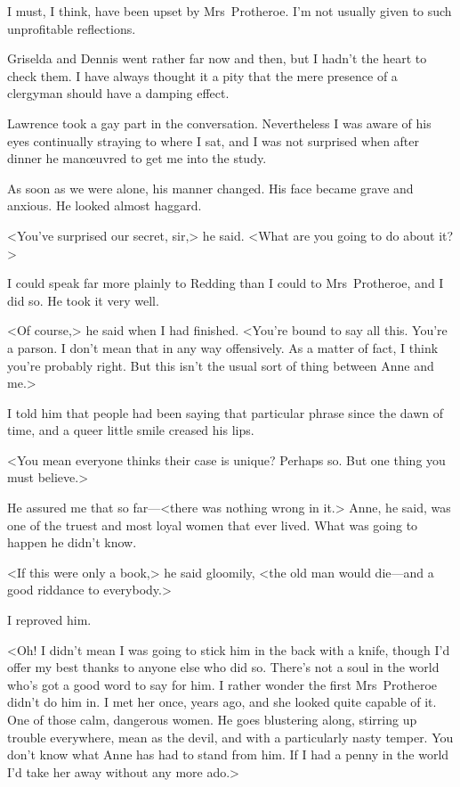 I must, I think, have been upset by Mrs~Protheroe. I'm not usually given to such unprofitable reflections.

Griselda and Dennis went rather far now and then, but I hadn't the heart to check them. I have always thought it a pity that the mere presence of a clergyman should have a damping effect.

Lawrence took a gay part in the conversation. Nevertheless I was aware of his eyes continually straying to where I sat, and I was not surprised when after dinner he manœuvred to get me into the study.

As soon as we were alone, his manner changed. His face became grave and anxious. He looked almost haggard.

<You've surprised our secret, sir,> he said. <What are you going to do about it?>

I could speak far more plainly to Redding than I could to Mrs~Protheroe, and I did so. He took it very well.

<Of course,> he said when I had finished. <You're bound to say all this. You're a parson. I don't mean that in any way offensively. As a matter of fact, I think you're probably right. But this isn't the usual sort of thing between Anne and me.>

I told him that people had been saying that particular phrase since the dawn of time, and a queer little smile creased his lips.

<You mean everyone thinks their case is unique? Perhaps so. But one thing you must believe.>

He assured me that so far—<there was nothing wrong in it.> Anne, he said, was one of the truest and most loyal women that ever lived. What was going to happen he didn't know.

<If this were only a book,> he said gloomily, <the old man would die—and a good riddance to everybody.>

I reproved him.

<Oh! I didn't mean I was going to stick him in the back with a knife, though I'd offer my best thanks to anyone else who did so. There's not a soul in the world who's got a good word to say for him. I rather wonder the first Mrs~Protheroe didn't do him in. I met her once, years ago, and she looked quite capable of it. One of those calm, dangerous women. He goes blustering along, stirring up trouble everywhere, mean as the devil, and with a particularly nasty temper. You don't know what Anne has had to stand from him. If I had a penny in the world I'd take her away without any more ado.>

